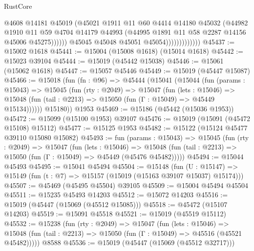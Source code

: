 \begin{lexlean}{RustCore}
\begin{coremodule}
                                    @4608
                                    @14181
                                    @45019
                                    (@45021
                                      @1911
                                      @11
                                      @60
                                      @4414
                                      @14180
                                      @45032
                                      (@44982
                                        @1910
                                        @11
                                        @59
                                        @4704
                                        @14179
                                        @44993
                                        (@44995 @1891 @11 @58 @2287 @14156 @45006 @45275))))))
                              @45045
                              @45048
                              @45051
                              @45054)))))))))))))
@45437 := @15002 @1618
@45441 := @15004 (@15008 @1618) (@15014 @1618)
@45442 := @15023 @39104
@45444 := @15019 (@45442 @15038)
@45446 := @15061 (@15062 @1618)
@45447 := @15057 @45446
@45449 := @15019 (@45447 @15087)
@45466 := @15018
    (fun (fn : @96) =>
    @45444
      (@15041
        (@15044
          (fun (params : @15043) =>
          @15045
            (fun (rty : @2049) =>
            @15047
              (fun (lets : @15046) =>
              @15048 (fun (tail : @2213) => @15050 (fun (Γ : @15049) => @45449 @15134))))))
        @15180))
    @1953
@45469 := @15186 (@45442 (@15036 @1953))
@45472 := @15099 (@15100 @1953) @39107
@45476 := @15019 (@15091 (@45472 @15108) @15112)
@45477 := @15125 @1953
@45482 := @15122 (@15124 @45477 @39110 @15080 @15082)
@45493 := fun (params : @15043) =>
  @15045
    (fun (rty : @2049) =>
    @15047
      (fun (lets : @15046) =>
      @15048 (fun (tail : @2213) => @15050 (fun (Γ : @15049) => @45449 (@45476 @45482)))))
@45494 := @15044 @45493
@45495 := @15041 @45494
@45504 := @15148
    (fun (U : @15147) => @15149 (fun (t : @7) => @15157 (@15019 (@15163 @39107 @15037) @15174)))
@45507 := @45469 (@45495 @45504) @39105
@45509 := @15004 @45494 @45504
@45511 := @15235 @45493 @14203
@45512 := @15072 @14203
@45516 := @15019 (@45447 (@15069 (@45512 @15085)))
@45518 := @45472 (@15107 @14203)
@45519 := @15091 @45518
@45521 := @15019 (@45519 @15112)
@45532 := @15238
    (fun (rty : @2049) =>
    @15047
      (fun (lets : @15046) =>
      @15048 (fun (tail : @2213) => @15050 (fun (Γ : @15049) => @45516 (@45521 @45482)))))
    @8588
@45536 := @15019 (@45447 (@15069 (@45512 @32717)))

\end{coremodule}
\end{lexlean}
